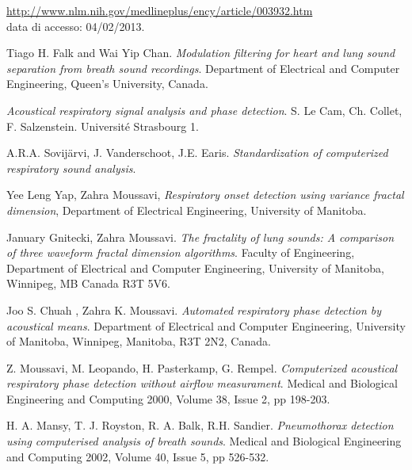 \begin{thebibliography}{99}
  \url{http://www.nlm.nih.gov/medlineplus/ency/article/003932.htm}\\
  data di accesso: 04/02/2013.

  Tiago H. Falk and Wai Yip Chan.
  \emph{Modulation filtering for heart and lung sound separation from breath sound recordings}.
  Department of Electrical and Computer Engineering, Queen's University, Canada.

  \emph{Acoustical respiratory signal analysis and phase detection}.
  S. Le Cam, Ch. Collet, F. Salzenstein.
  Universit\'e Strasbourg 1.

  A.R.A. Sovij\"{a}rvi, J. Vanderschoot, J.E. Earis.
  \emph{Standardization of computerized respiratory sound analysis}.






  Yee Leng Yap, Zahra Moussavi,
  \emph{Respiratory onset detection using variance fractal dimension},
  Department of Electrical Engineering, University of Manitoba.

  January Gnitecki, Zahra Moussavi.
  \emph{The fractality of lung sounds: A comparison of three waveform fractal dimension algorithms}.
  Faculty of Engineering, Department of Electrical and Computer Engineering, University of Manitoba, Winnipeg, MB Canada R3T 5V6.




  Joo S. Chuah , Zahra K. Moussavi.
  \emph{Automated respiratory phase detection by acoustical means}.
  Department of Electrical and Computer Engineering, University of Manitoba, Winnipeg, Manitoba, R3T 2N2, Canada.
  

  Z. Moussavi, M. Leopando, H. Pasterkamp, G. Rempel.
  \emph{Computerized acoustical respiratory phase detection without airflow measurament}.
  Medical and Biological Engineering and Computing 2000, Volume 38, Issue 2, pp 198-203.


  H. A. Mansy, T. J. Royston, R. A. Balk, R.H. Sandier.
  \emph{Pneumothorax detection using computerised analysis of breath sounds}.
  Medical and Biological Engineering and Computing 2002, Volume 40, Issue 5, pp 526-532.



\end{thebibliography}
